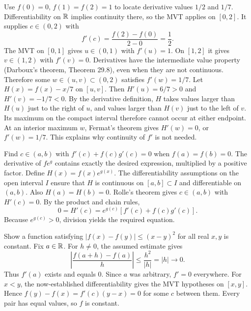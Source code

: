 \goal Use $f(0)=0$, $f(1)=f(2)=1$ to locate derivative values $1/2$ and $1/7$.
Differentiability on $\mathbb{R}$ implies continuity there, so the MVT applies on $[0,2]$. It supplies $c\in(0,2)$ with
\[
 f'(c)=\frac{f(2)-f(0)}{2-0}=\frac12.
\]
The MVT on $[0,1]$ gives $u\in(0,1)$ with $f'(u)=1$. On $[1,2]$ it gives $v\in(1,2)$ with $f'(v)=0$. Derivatives have the intermediate value property (Darboux's theorem, Theorem 29.8), even when they are not continuous. Therefore some $w\in(u,v)\subset(0,2)$ satisfies $f'(w)=1/7$.
Let $H(x)=f(x)-x/7$ on $[u,v]$. Then $H'(u)=6/7>0$ and $H'(v)=-1/7<0$. By the derivative definition, $H$ takes values larger than $H(u)$ just to the right of $u$, and values larger than $H(v)$ just to the left of $v$. Its maximum on the compact interval therefore cannot occur at either endpoint. At an interior maximum $w$, Fermat's theorem gives $H'(w)=0$, or $f'(w)=1/7$. This explains why continuity of $f'$ is not needed.

\goal Find $c\in(a,b)$ with $f'(c)+f(c)g'(c)=0$ when $f(a)=f(b)=0$.
\idea The derivative of $fe^g$ contains exactly the desired expression, multiplied by a positive factor.
Define $H(x)=f(x)e^{g(x)}$. The differentiability assumptions on the open interval $I$ ensure that $H$ is continuous on $[a,b]\subset I$ and differentiable on $(a,b)$. Also $H(a)=H(b)=0$. Rolle's theorem gives $c\in(a,b)$ with $H'(c)=0$.
By the product and chain rules,
\[
 0=H'(c)=e^{g(c)}[f'(c)+f(c)g'(c)].
\]
Because $e^{g(c)}>0$, division yields the required equation.

\goal Show a function satisfying $|f(x)-f(y)|\le(x-y)^2$ for all real $x,y$ is constant.
Fix $a\in\mathbb{R}$. For $h\ne0$, the assumed estimate gives
\[
 \left|\frac{f(a+h)-f(a)}h\right|\le\frac{h^2}{|h|}=|h|\longrightarrow0.
\]
Thus $f'(a)$ exists and equals $0$. Since $a$ was arbitrary, $f'=0$ everywhere.
For $x<y$, the now-established differentiability gives the MVT hypotheses on $[x,y]$. Hence $f(y)-f(x)=f'(c)(y-x)=0$ for some $c$ between them. Every pair has equal values, so $f$ is constant.

